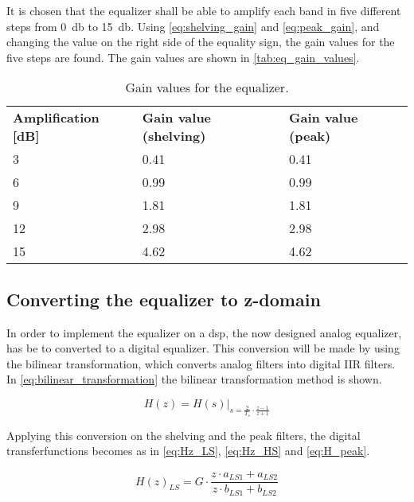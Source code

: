 It is chosen that the equalizer shall be able to amplify each band in five different steps from \SI{0}{\decibel} to \SI{15}{\decibel}. Using \autoref{eq:shelving_gain} and \autoref{eq:peak_gain}, and changing the value on the right side of the equality sign, the gain values for the five steps are found. The gain values are shown in \autoref{tab:eq_gain_values}. 

\begin{table}[htbp]
\centering
\caption{Gain values for the equalizer.}
\label{tab:eq_gain_values}
\begin{tabular}{|l|l|l|}
\cline{1-3}
\textbf{Amplification [dB]} & \textbf{Gain value (shelving)} & \textbf{Gain value (peak)} \\ \cline{1-3} 
3 & 0.41 & 0.41 \\  \cline{1-3} 
6 & 0.99 & 0.99 \\ \cline{1-3} 
9 & 1.81 & 1.81 \\ \cline{1-3} 
12 & 2.98 & 2.98 \\ \cline{1-3} 
15 & 4.62 & 4.62 \\ \cline{1-3} 
\end{tabular}
\end{table}

\subsection{Converting the equalizer to z-domain}
In order to implement the equalizer on a \gls{dsp}, the now designed analog equalizer, has be to converted to a digital equalizer. This conversion will be made by using the bilinear transformation, which converts analog filters into digital IIR filters. In \autoref{eq:bilinear_transformation} the bilinear transformation method is shown.

\begin{equation}\label{eq:bilinear_transformation}
        H(z) = H(s) \Big|_{s = \frac{2}{T_s} \cdot \frac{z-1}{z+1}}
    \end{equation}
    
    \startexplain
    \stopexplain
    
Applying this conversion on the shelving and the peak filters, the digital transferfunctions becomes as in \autoref{eq:Hz_LS}, \autoref{eq:Hz_HS} and \autoref{eq:H_peak}.

\begin{equation}\label{eq:Hz_LS}
        H(z)_{LS} = G \cdot \frac{z \cdot a_{LS1} + a_{LS2}}{z \cdot b_{LS1} + b_{LS2}}
    \end{equation}
    
